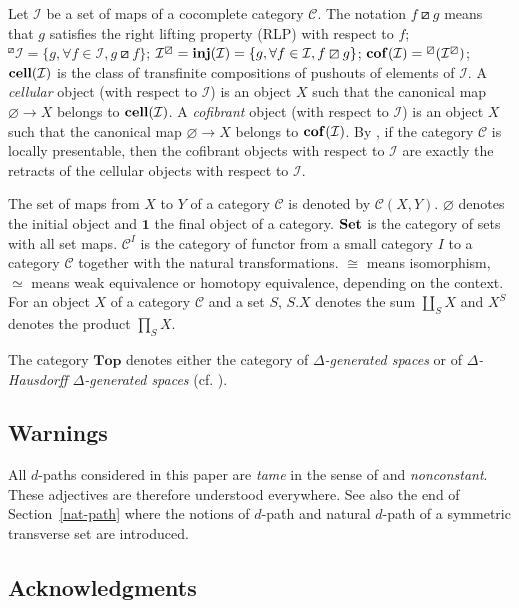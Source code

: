 \documentclass[a4paper,12pt]{amsart}
\newcommand{\C}{\mathcal{C}}
\theoremstyle{definition}
\renewcommand{\top}{{\mathbf{Top}}}
\newcommand{\iso}{\cong}
\newcommand{\brm}[1]{{\rm{\mathbf{#1}}}}
\newcommand{\set}{{\brm{Set}}}
\DeclareMathOperator{\cell}{{\brm{cell}}}
\DeclareMathOperator{\cof}{{\brm{cof}}}
\DeclareMathOperator{\inj}{{\brm{inj}}}
\begin{document}
Let $\mathcal{I}$ be a set of maps of a cocomplete category $\C$. The notation $f\boxslash g$ means that $g$ satisfies the right lifting property (RLP) with respect to $f$; ${^\boxslash}\mathcal{I} = \{g, \forall f \in \mathcal{I}, g\boxslash f\}$; $\mathcal{I}^\boxslash = \inj(\mathcal{I}) = \{g, \forall f \in \mathcal{I}, f\boxslash g\}$; $\cof(\mathcal{I})={^\boxslash}(\mathcal{I}^\boxslash)$; $\cell(\mathcal{I})$ is the class of transfinite compositions of pushouts of elements of $\mathcal{I}$. A \textit{cellular} object (with respect to $\mathcal{I}$) is an object $X$ such that the canonical map $\varnothing \to X$ belongs to $\cell(\mathcal{I})$. A \textit{cofibrant} object (with respect to $\mathcal{I}$) is an object $X$ such that the canonical map $\varnothing \to X$ belongs to $\cof(\mathcal{I})$. By \cite[Corollary~2.1.15]{MR99h:55031}, if the category $\C$ is locally presentable, then the cofibrant objects with respect to $\mathcal{I}$ are exactly the retracts of the cellular objects with respect to $\mathcal{I}$. 

The set of maps from $X$ to $Y$ of a category $\C$ is denoted by $\C(X,Y)$. $\varnothing$ denotes the initial object and $\mathbf{1}$ the final object of a category. $\set$ is the category of sets with all set maps. $\C^I$ is the category of functor from a small category $I$ to a category $\C$ together with the natural transformations. $\iso$ means isomorphism, $\simeq$ means weak equivalence or homotopy equivalence, depending on the context. For an object $X$ of a category $\C$ and a set $S$, $S.X$ denotes the sum $\coprod_S X$ and $X^S$ denotes the product $\prod_S X$. 

The category $\top$ denotes either the category of \textit{$\Delta$-generated spaces} or of \textit{$\Delta$-Hausdorff $\Delta$-generated spaces} (cf. \cite[Section~2 and Appendix~B]{leftproperflow}). 


\subsection*{Warnings}

All $d$-paths considered in this paper are \textit{tame} in the sense of \cite[Section~2.9]{MR4070250} and \textit{nonconstant}. These adjectives are therefore understood everywhere. See also the end of Section~\ref{nat-path} where the notions of $d$-path and natural $d$-path of a symmetric transverse set are introduced.

\subsection*{Acknowledgments}
\end{document}
